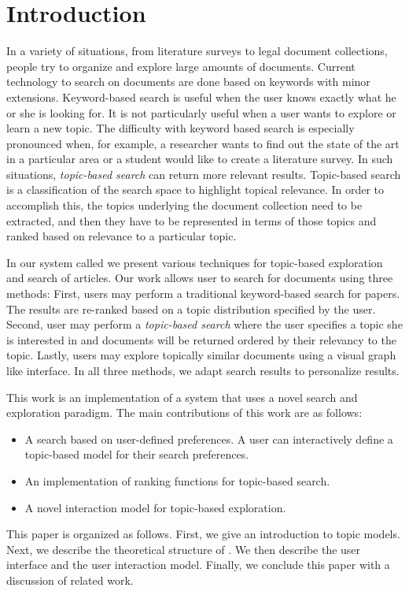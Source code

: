 \section{Introduction}

In a variety of situations, from literature surveys to legal 
document collections, people try to organize and explore large 
amounts of documents. Current technology to search on documents are 
done based on keywords with minor extensions. Keyword-based search is useful when the 
user knows exactly what he or she is looking for. It is not 
particularly useful when a user wants to explore or learn a new 
topic. 
The difficulty with keyword based search is especially pronounced when, for
example, a researcher wants to find out the state of the art in a particular
area or a student would like to create a literature survey. In such situations,
\textsl{topic-based search} can return more relevant results. 
Topic-based search is a classification of the search space to 
highlight topical relevance. In order to accomplish this, the topics 
underlying the document collection need to be extracted, and then 
they have to be represented in terms of those topics and ranked 
based on relevance to a particular topic. 

In our system called \system we present various techniques for topic-based exploration 
and search of articles. Our work allows user 
to search for documents using three methods: 
First, users may perform a traditional keyword-based search for papers.
The results are re-ranked based on a topic distribution specified by the user. 
Second, user may perform a \textsl{topic-based search} where the user specifies 
a topic she is interested in and documents will be returned ordered 
by their relevancy to the topic.
Lastly, users 
may explore topically similar documents using a visual 
graph like interface. In all 
three methods, we adapt search results to personalize results.


This work is an implementation of a system that uses a novel search and 
exploration paradigm. The main contributions of this work are as follows:
\begin{itemize}
\item A search based on user-defined preferences. A user can
interactively define a topic-based model for their search preferences.
\item An implementation of ranking functions for topic-based search.
\item A novel interaction model for topic-based exploration.
\end{itemize}

This paper is organized as follows. First, we give an introduction 
to topic models. Next, we describe the theoretical structure of \system.
We then describe the user interface and the user interaction model.
Finally, we conclude this paper with a discussion of related work.





